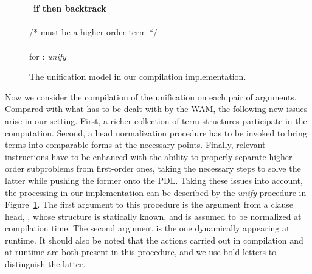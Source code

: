 \begin{figure}
\begin{tabbing}
                  \>      \>             \\
                  \>      \>            \\
                  \>      \>            \ \={\bf if \boldmath  then backtrack} \\
                  \>      \>            \>             \\
                  \>      \>             /*  must be a higher-order term */ \\
                  \>      \>            \>             \\
                  \>      \>            \>for : {\it unify}\ 
\end{tabbing}
\caption{The unification model in our compilation
implementation.}\label{fig:unify}
\end{figure}

Now we consider the compilation
of the unification on each pair of arguments. Compared with what has
to be dealt with by the WAM, the following new issues arise in our
setting.
First, a richer collection of term structures participate in the
computation. Second, a head normalization procedure has to be invoked
to bring terms into comparable forms at the necessary
points. Finally, relevant instructions have to be enhanced with
the ability to properly separate higher-order subproblems from
first-order ones, taking the necessary steps to solve the latter while
pushing the former onto the PDL.
Taking these issues into account, the processing in our implementation can be
described by the {\it unify} procedure in Figure~\ref{fig:unify}.
The first argument to this procedure is the argument from a clause head,
\ie, whose structure is statically known, and is assumed to be normalized
at compilation time. The second argument is the one dynamically appearing
at runtime. It should also be noted that the actions carried out in
compilation and at runtime are both present in this procedure, and we use
bold letters to distinguish the latter.

